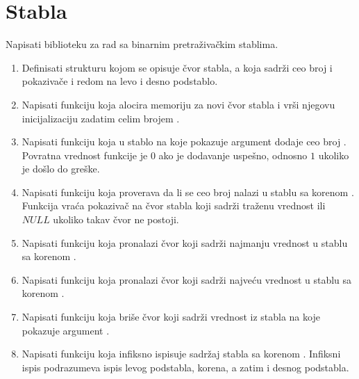 \section{Stabla}

\begin{Exercise}[label=4_14]
Napisati biblioteku za rad sa binarnim pretraživačkim stablima.

\begin{enumerate}
\item Definisati strukturu  kojom se opisuje čvor stabla, a koja sadrži ceo broj  i pokazivače  i  redom na levo i desno podstablo.

\item Napisati funkciju  koja alocira memoriju za novi čvor stabla i vrši njegovu inicijalizaciju zadatim celim brojem .

\item Napisati funkciju  koja u stablo na koje pokazuje argument  dodaje ceo broj . Povratna vrednost funkcije je $0$ ako je dodavanje uspešno, odnosno $1$ ukoliko je došlo do greške.  

\item Napisati funkciju  koja proverava da li se ceo broj  nalazi u stablu sa korenom . Funkcija vraća pokazivač na čvor stabla koji sadrži traženu vrednost ili $NULL$ ukoliko takav čvor ne postoji.

\item Napisati funkciju  koja pronalazi čvor koji sadrži najmanju vrednost u stablu sa korenom . 

\item Napisati funkciju  koja pronalazi čvor koji sadrži najveću vrednost u stablu sa korenom .

\item Napisati funkciju  koja briše čvor koji sadrži vrednost  iz stabla na koje pokazuje argument .

\item Napisati funkciju  koja infiksno ispisuje sadržaj stabla sa korenom . Infiksni ispis podrazumeva ispis levog podstabla, korena, a zatim i desnog podstabla.


\end{enumerate}
\end{Exercise}
